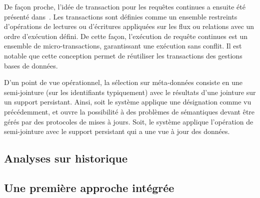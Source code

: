 De façon proche, l'idée de transaction pour les requêtes continues a ensuite été présenté dans~\cite{Botan:transaction}. Les transactions sont définies comme un ensemble restreints d'opérations de lectures ou d'écritures appliquées sur les flux ou relations avec un ordre d'exécution défini. De cette façon, l'exécution de requête continues est un ensemble de micro-transactions, garantissant une exécution sans conflit. Il est notable que cette conception permet de réutiliser les transactions des gestions bases de données.

D'un point de vue opérationnel, la sélection sur méta-données consiste en une semi-jointure (sur les identifiants typiquement) avec le résultats d'une jointure sur un support persistant. Ainsi, soit le système applique une désignation comme vu précédemment, et ouvre la possibilité à des problèmes de sémantiques devant être gérés par des protocoles de mises à jours. Soit, le système applique l'opération de semi-jointure avec le support persistant qui a une vue à jour des données.

\subsection{Analyses sur historique}

%
\subsection{Une première approche intégrée}


